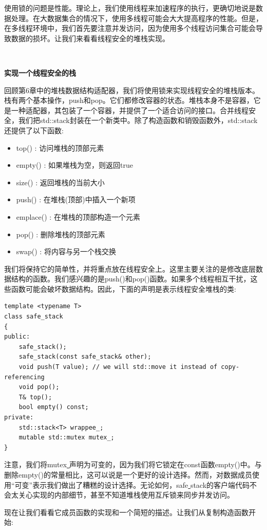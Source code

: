 使用锁的问题是性能。理论上，我们使用线程来加速程序的执行，更确切地说是数据处理。在大数据集合的情况下，使用多线程可能会大大提高程序的性能。但是，在多线程环境中，我们首先要注意并发访问，因为使用多个线程访问集合可能会导致数据的损坏。让我们来看看线程安全的堆栈实现。 \par

\noindent\textbf{}\ \par
\textbf{实现一个线程安全的栈} \ \par
回顾第6章中的堆栈数据结构适配器，我们将使用锁来实现线程安全的堆栈版本。栈有两个基本操作，push和pop。它们都修改容器的状态。堆栈本身不是容器，它是一种适配器，其包装了一个容器，并提供了一个适合访问的接口。合并线程安全，我们把std::stack封装在一个新类中。除了构造函数和销毁函数外，std::stack还提供了以下函数: \par

\begin{itemize}
	\item top() : 访问堆栈的顶部元素
	\item empty() : 如果堆栈为空，则返回true
	\item size() : 返回堆栈的当前大小
	\item push() : 在堆栈(顶部)中插入一个新项
	\item emplace() : 在堆栈的顶部构造一个元素
	\item pop() : 删除堆栈的顶部元素
	\item swap() : 将内容与另一个栈交换
\end{itemize}

我们将保持它的简单性，并将重点放在线程安全上。这里主要关注的是修改底层数据结构的函数。我们感兴趣的是push()和pop()函数。如果多个线程相互干扰，这些函数可能会破坏数据结构。因此，下面的声明是表示线程安全堆栈的类: \par

\begin{lstlisting}[caption={}]
template <typename T>
class safe_stack
{
public:
	safe_stack();
	safe_stack(const safe_stack& other);
	void push(T value); // we will std::move it instead of copy-referencing
	void pop();
	T& top();
	bool empty() const;
private:
	std::stack<T> wrappee_;
	mutable std::mutex mutex_;
}
\end{lstlisting}

注意，我们将mutex\underline{ }声明为可变的，因为我们将它锁定在const函数empty()中。与删除empty()的常量相比，这可以说是一个更好的设计选择。然而，对数据成员使用“可变”表示我们做出了糟糕的设计选择。无论如何，safe\underline{ }stack的客户端代码不会太关心实现的内部细节，甚至不知道堆栈使用互斥锁来同步并发访问。 \par
现在让我们看看它成员函数的实现和一个简短的描述。让我们从复制构造函数开始: \par

